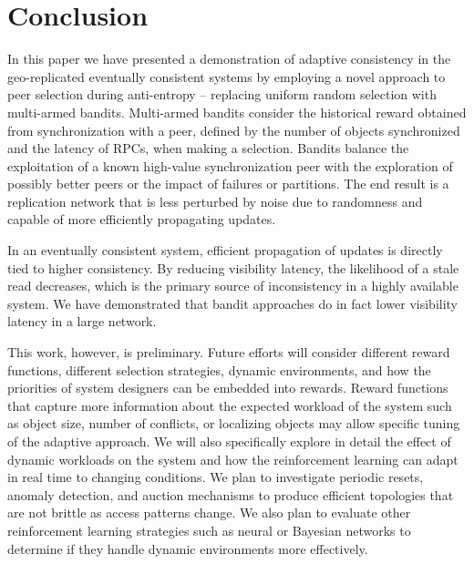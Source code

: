 \section{Conclusion}

In this paper we have presented a demonstration of adaptive consistency in
the geo-replicated eventually consistent systems by employing a novel
approach to peer selection during anti-entropy -- replacing uniform random
selection with multi-armed bandits.
Multi-armed bandits consider the historical reward obtained from
synchronization with a peer, defined by the number of objects synchronized
and the latency of RPCs, when making a selection.
Bandits balance the exploitation of a known high-value synchronization
peer with the exploration of possibly better peers or the impact of
failures or partitions.
The end result is a replication network that is less perturbed by noise
due to randomness and capable of more efficiently propagating updates.

In an eventually consistent system, efficient propagation of updates is
directly tied to higher consistency.
By reducing visibility latency, the likelihood of a stale read decreases,
which is the primary source of inconsistency in a highly available system.
We have demonstrated that bandit approaches do in fact lower visibility
latency in a large network.

This work, however, is preliminary.
Future efforts will consider different reward functions, different selection
strategies, dynamic environments, and how the priorities of system designers
can be embedded into rewards.
Reward functions that capture more information about the expected workload of
the system such as object size, number of conflicts, or localizing objects
may allow specific tuning of the adaptive approach.
We will also specifically explore in detail the effect of dynamic workloads
on the system and how the reinforcement learning can adapt in real time to
changing conditions.
We plan to investigate periodic resets, anomaly detection, and auction
mechanisms to produce efficient topologies that are not brittle as access
patterns change.
We also plan to evaluate other reinforcement learning strategies such as
neural or Bayesian networks to determine if they handle dynamic environments
more effectively.


